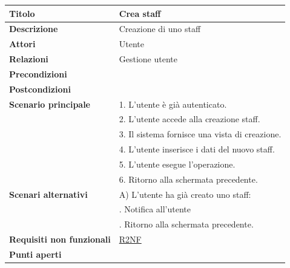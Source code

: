 \documentclass[a4paper]{article}
\begin{document}
\begin{center}
\begin{tabularx}{1\textwidth}{|l|X|}
    \hline
		\textbf{Titolo} & Crea staff \\
		\hline
		\textbf{Descrizione} & Creazione di uno staff \\
		\hline
		\textbf{Attori} & Utente \\
		\hline
		\textbf{Relazioni} & Gestione utente \\
		\hline
		\textbf{Precondizioni} &  \\
		\hline
		\textbf{Postcondizioni} &  \\
		\hline
		\textbf{Scenario principale} & 1. L'utente è già autenticato.\\
		                             & 2. L'utente accede alla creazione staff. \\
									 & 3. Il sistema fornisce una vista di creazione. \\
									 & 4. L'utente inserisce i dati del nuovo staff. \\
									 & 5. L'utente esegue l'operazione.\\
									 & 6. Ritorno alla schermata precedente.\\
		\hline
		\textbf{Scenari alternativi} & A) L'utente ha già creato uno staff: \\
									 & \quad 1. Notifica all'utente \\
									 & \quad 2. Ritorno alla schermata precedente.\\
		\hline
		\textbf{Requisiti non funzionali} & \hyperlink{R2NF}{R2NF} \\
		\hline
		\textbf{Punti aperti} & \\
		\hline
	\end{tabularx}
\end{center}

\end{document}
